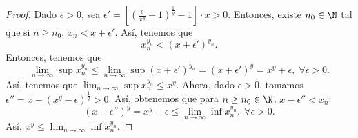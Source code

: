 \begin{proof}
	Dado $\displaystyle \epsilon > 0 $, sea $\displaystyle \epsilon ' = \left[\left(\frac{\epsilon }{x^{y}}+1\right)^{\frac{1}{y}}-1\right] \cdot x > 0 $. Entonces, existe $\displaystyle n_{0} \in \N $ tal que si $\displaystyle n \geq n_{0} $, $\displaystyle x_{n} < x + \epsilon ' $. Así, tenemos que 
\[x_{n}^{y_{n}} < \left(x + \epsilon'\right)^{y_{n}} .\]
Entonces, tenemos que 
\[\lim_{n \to \infty}\sup x_{n}^{y_{n}} \leq \lim_{n \to \infty}\sup\left(x+\epsilon'\right)^{y_{n}}=\left(x+\epsilon'\right)^{y} = x^{y}+\epsilon, \; \forall \epsilon > 0.\]
Así, tenemos que $\displaystyle \lim_{n \to \infty}\sup x_{n}^{y_{n}} \leq x^{y} $. Ahora, dado $\displaystyle \epsilon > 0 $, tomamos $\displaystyle \epsilon '' = x - \left(x^{y}-\epsilon \right)^{\frac{1}{y}} > 0 $. Así, obtenemos que para $\displaystyle n \geq n_{0}\in\N $, $\displaystyle x-\epsilon '' < x_{n} $:
\[\left(x - \epsilon ''\right)^{y} = x^{y}-\epsilon \leq \lim_{n \to \infty}\inf x_{n}^{y_{n}}, \; \forall \epsilon > 0 .\]
Así, $\displaystyle x^{y} \leq \lim_{n \to \infty}\inf x_{n}^{y_{n}} $.
\end{proof}


